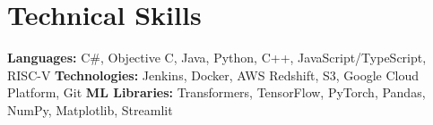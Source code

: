 \section{Technical Skills}
    \begin{itemize}[leftmargin=0.15in, label={}]
	\small{\item{
		\textbf{Languages:} C\#, Objective C, Java, Python, C++, JavaScript/TypeScript, RISC-V
		\textbf{Technologies:} Jenkins, Docker, AWS Redshift, S3, Google Cloud Platform, Git
		\textbf{ML Libraries:} Transformers, TensorFlow, PyTorch, Pandas, NumPy, Matplotlib, Streamlit
	}}
    \end{itemize}
